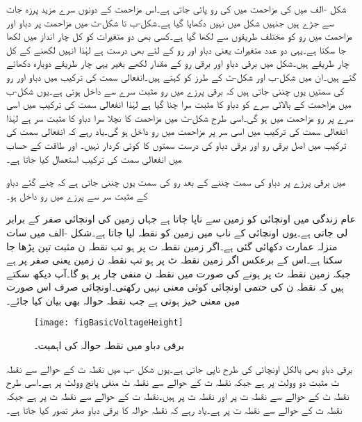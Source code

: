 شکل -الف میں  کی مزاحمت میں  کی رو پائی جاتی ہے۔اس مزاحمت کے دونوں سرے مزید پرزہ جات سے جڑے ہیں جنہیں شکل میں نہیں دکھایا گیا ہے۔شکل-ب تا شکل-ٹ میں مزاحمت پر دباو اور مزاحمت میں رو کو مختلف طریقوں سے لکھا گیا ہے۔کسی بھی دو متغیرات کو کل چار انداز میں لکھا جا سکتا ہے۔یہی دو عدد متغیرات یعنی دباو اور رو کے لئے بھی درست ہے لہٰذا انہیں لکھنے کے کل چار طریقے ہیں۔شکل  میں برقی دباو اور برقی رو کے مقدار لکھے بغیر یہی چار طریقے دوبارہ دکھائے گئے ہیں۔ان میں شکل-ب اور شکل-ٹ کے طرز کو  کہتے ہیں۔انفعالی سمت کی ترکیب میں دباو  اور رو  کی سمتیں یوں چننی جاتی ہیں کہ برقی پرزے میں رو مثبت سرے سے داخل ہوتی ہے۔یوں شکل-ب میں مزاحمت کے بالائی سرے کو دباو کا مثبت سرا چنا گیا ہے لہٰذا انفعالی سمت کی ترکیب میں اسی سرے پر رو مزاحمت میں ہو گی۔اسی طرح شکل-ٹ میں مزاحمت کا نچلا سرا دباو کا مثبت سر ہے لہٰذا انفعالی سمت کی ترکیب میں اسی سر پر مزاحمت میں رو داخل ہو گی۔یاد رہے کہ انفعالی سمت کی ترکیب میں اصل برقی رو اور برقی دباو کی درست سمتوں کا کوئی کردار نہیں۔ اور طاقت کے حساب میں انفعالی سمت کی ترکیب استعمال کیا جاتا ہے۔

 میں برقی پرزے پر دباو کی سمت چننے کے بعد رو کی سمت یوں چننی جاتی ہے کہ چنے گئے دباو کے مثبت سر سے پرزے میں  رو داخل ہو۔

عام زندگی میں اونچائی کو زمین سے ناپا جاتا ہے جہاں زمین کی اونچائی صفر کے برابر لی جاتی ہے۔یوں اونچائی کے ناپ میں زمین کو نقطہ  لیا جاتا ہے۔شکل -الف میں سات منزلہ عمارت دکھائی گئی ہے۔اگر زمین نقطہ ت پر ہو تب نقطہ ن مثبت تین پڑھا جا سکتا ہے۔اس کے برعکس اگر زمین نقطہ ٹ پر ہو تب نقطہ ن زمین یعنی صفر پر ہے جبکہ زمین نقطہ ث پر ہونے کی صورت میں نقطہ ن منفی چار پر ہو گا۔آپ دیکھ سکتے ہیں کہ نقطہ ن کی حتمی اونچائی کوئی معنی نہیں رکھتی۔اونچائی صرف اس صورت میں معنی خیز ہوتی ہے جب نقطہ حوالہ بھی بیان کیا جائے۔
\begin{figure}
\centering
\texttt{[image: figBasicVoltageHeight]}
\caption{برقی دباو میں نقطہ حوالہ کی اہمیت۔}
\label{شکل_بنیادی_دباو_اور_اونچائی}
\end{figure}
برقی دباو بھی بالکل اونچائی کی طرح ناپی جاتی ہے۔یوں شکل -ب میں نقطہ ت کے حوالے سے نقطہ ٹ مثبت دو وولٹ  پر ہے جبکہ نقطہ ث کے حوالے سے نقطہ ٹ منفی پانچ وولٹ  پر ہے۔اسی طرح نقطہ ٹ کے حوالے سے نقطہ ت  پر اور نقطہ ث  پر ہیں۔نقطہ ت کے حوالے سے نقطہ ث  پر ہے جبکہ نقطہ ث کے حوالے سے نقطہ ت  پر ہے۔یاد رہے کہ نقطہ حوالہ کا برقی دباو صفر تصور کیا جاتا ہے۔

